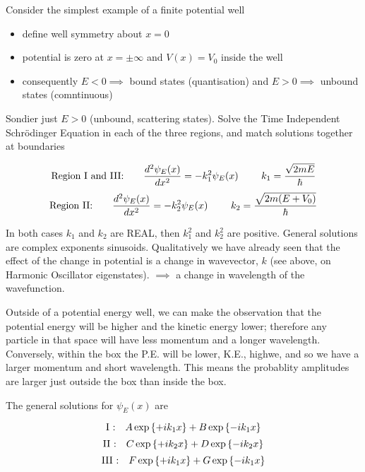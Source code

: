 \documentclass[english, 11pt]{article}
\begin{document}
      Consider the simplest example of a finite potential well

      \begin{itemize}
        \item define well symmetry about $x = 0$
        \item potential is zero at $x = \pm \infty$ and $V(x) = V_0$ inside the well
        \item consequently $E<0 \implies$ bound states (quantisation) and $E>0 \implies$ unbound states (comntinuous)
      \end{itemize}

      Sondier just $E > 0$ (unbound, scattering states). Solve the Time Independent Schrödinger Equation in each of the three regions, and match solutions together at boundaries

      \[ \mbox{Region I and III: } \ \ \ \ \ \f{d^2\psi_E(x)}{dx^2} = -k_1^2\psi_E(x) \ \ \ \ \ \ \ k_1 = \f{\sqrt{2mE}}{\hbar} \]
      \[ \mbox{Region II: } \ \ \ \ \ \f{d^2\psi_E(x)}{dx^2} = -k_2^2\psi_E(x) \ \ \ \ \ \ \ k_2 = \f{\sqrt{2m(E+V_0)}}{\hbar} \]

      In both cases $k_1$ and $k_2$ are REAL, then $k_1^2$ and $k_2^2$ are positive. General solutions are complex exponents sinusoids. Qualitatively we have already seen that the effect of the change in potential is a change in wavevector, $k$ (see above, on Harmonic Oscillator eigenstates). $\implies$ a change in wavelength of the wavefunction.\newline


      Outside of a potential energy well, we can make the observation that the potential energy will be higher and the kinetic energy lower; therefore any particle in that space will have less momentum and a longer wavelength. Conversely, within the box the P.E. will be lower, K.E., highwe, and so we have a larger momentum and short wavelength. This means the probablity amplitudes are larger just outside the box than inside the box.\newline

      The general solutions for $\psi_E(x)$ are

      \[ \mbox{I :} \ \ \ A\exp \left\{ +ik_1x \right\} + B\exp \left\{ -ik_1x \right\} \]
      \[ \mbox{II :} \ \ \ C\expo{+ik_2x} + D\expo{-ik_2x} \]
      \[ \mbox{III :} \ \ \ F\exp \left\{ +ik_1x \right\} + G\exp \left\{ -ik_1x \right\} \]
\end{document}
